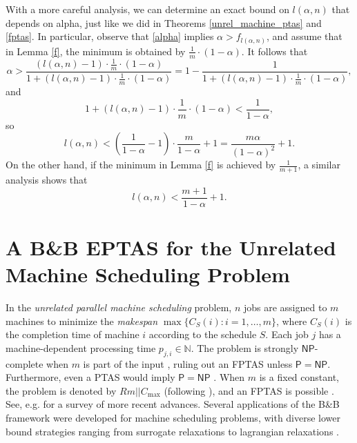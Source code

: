 \documentclass[a4paper,UKenglish,cleveref, autoref, thm-restate, pdfa]{lipics-v2021}
\theoremstyle{plain}
\begin{document}
\begin{remark}
    With a more careful analysis, we can determine an exact bound on $l(\alpha, n)$ that depends on alpha, just like we did in Theorems \ref{unrel_machine_ptas} and \ref{fptas}. In particular, observe that \eqref{alpha} implies $\alpha > f_{l(\alpha, n)}$, and assume that in Lemma \ref{f}, the minimum is obtained by $\frac{1}{m}\cdot (1-\alpha)$. It follows that 
    \[
    \alpha > \frac{(l(\alpha,n)-1)\cdot \frac{1}{m}\cdot (1-\alpha)}{1+(l(\alpha,n)-1)\cdot \frac{1}{m}\cdot (1-\alpha)} = 1- \frac{1}{1+(l(\alpha,n)-1)\cdot \frac{1}{m}\cdot (1-\alpha)},
    \]
    and 
    \[
    1+(l(\alpha,n)-1)\cdot \frac{1}{m}\cdot (1-\alpha) < \frac{1}{1-\alpha},
    \]
    so
    \[
    l(\alpha,n) < \left(\frac{1}{1-\alpha} -1\right)\cdot \frac{m}{1-\alpha} + 1= \frac{m\alpha}{(1-\alpha)^2}+1.
    \]
    On the other hand, if the minimum in Lemma \ref{f} is achieved by $\frac{1}{m+1}$, a similar analysis shows that 
    \[
    l(\alpha, n) < \frac{m+1}{1-\alpha} + 1.
    \]
\end{remark}
 
\section{A B\&B EPTAS for the Unrelated Machine Scheduling Problem}\label{sec:js_ptas}

In the \emph{unrelated parallel machine scheduling} problem, $n$ jobs are assigned to $m$ machines to minimize the \emph{makespan} $\max\{C_S(i) : i = 1, \dots, m\}$, where $C_S(i)$ is the completion time of machine $i$ according to the schedule $S$. Each job $j$ has a machine-dependent processing time $p_{j, i} \in \mathbb{N}$. The problem is strongly $\mathsf{NP}$-complete when $m$ is part of the input \cite{garey_johnson_1}, ruling out an FPTAS unless $\mathsf{P} = \mathsf{NP}$. Furthermore, even a PTAS would imply $\mathsf{P} = \mathsf{NP}$ \cite{lenstra_shmoys_tardos}. When $m$ is a fixed constant, the problem is denoted by $Rm || C_{\max}$ (following \cite{machine_scheduling_review}), and an FPTAS is possible \cite{horowitz_sahni_job_fptas,grouping_1}. See, e.g. \cite{job_survey} for a survey of more recent advances. Several applications of the B\&B framework were developed for machine scheduling problems, with diverse lower bound strategies ranging from surrogate relaxations \cite{van_de_velde} to lagrangian relaxations \cite{martello_soumis_toth}.  
\end{document}
